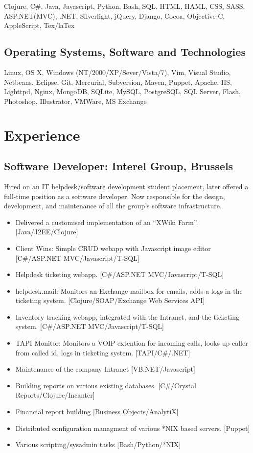 \documentclass{article}
\begin{document}
Clojure, C\#, Java, Javascript, Python, Bash, SQL, HTML, HAML, CSS, SASS, ASP.NET(MVC), .NET, Silverlight, jQuery, Django, Cocoa, Objective-C, AppleScript, Tex/laTex
\subsection*{Operating Systems, Software and Technologies}
\label{sec-2.2}

Linux, OS X, Windows (NT/2000/XP/Sever/Vista/7), Vim, Visual Studio, Netbeans, Eclipse, Git, Mercurial, Subversion, Maven, Puppet, Apache, IIS, Lighttpd, Nginx, MongoDB, SQLite, MySQL, PostgreSQL, SQL Server, Flash, Photoshop, Illustrator, VMWare, MS Exchange
\section*{Experience}
\label{sec-3}

\subsection*{Software Developer: Interel Group, Brussels}
\label{sec-3.1}

Hired on an IT helpdesk/software development student placement, later offered a full-time position as a software developer. Now responsible for the design, development, and maintenance of all the group's software infrastructure.
\begin{itemize}
\item Delivered a customised implementation of an ``XWiki Farm''. [Java/J2EE/Clojure]
\item Client Wins: Simple CRUD webapp with Javascript image editor [C\#/ASP.NET MVC/Javascript/T-SQL]
\item Helpdesk ticketing webapp. [C\#/ASP.NET MVC/Javascript/T-SQL]
\item helpdesk.mail: Monitors an Exchange mailbox for emails, adds a logs in the ticketing system. [Clojure/SOAP/Exchange Web Services API]
\item Inventory tracking webapp, integrated with the Intranet, and the ticketing system. [C\#/ASP.NET MVC/Javascript/T-SQL]
\item TAPI Monitor: Monitors a VOIP extention for incoming calls, looks up caller from called id, logs in ticketing system. [TAPI/C\#/.NET]
\item Maintenance of the company Intranet [VB.NET/Javascript]
\item Building reports on various existing databases. [C\#/Crystal Reports/Clojure/Incanter]
\item Financial report building [Business Objects/AnalytiX]
\item Distributed configuration managment of various *NIX based servers. [Puppet]
\item Various scripting/sysadmin tasks [Bash/Python/*NIX]
\end{itemize}
\end{document}
